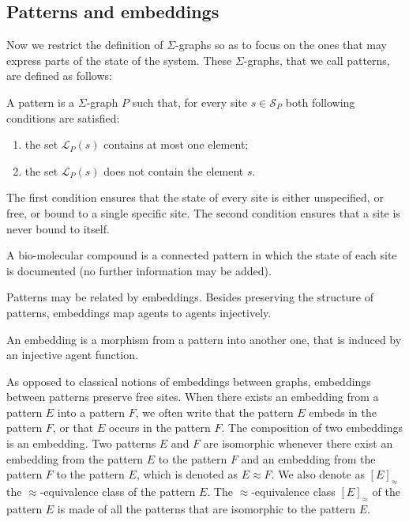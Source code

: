 \documentclass{entcs}
\newcommand{\graphsymb}{G}
\newcommand{\iso}{\approx}
\newcommand{\sites}[1][\graphsymb]{\mathcal{S}_{#1}}
\newcommand{\links}[1][\graphsymb]{\mathcal{L}_{#1}}
\begin{document}
\subsection{Patterns and embeddings}

Now we restrict the definition of $\Sigma$-graphs so as to
focus on the ones that may express parts of the state of the system.
These $\Sigma$-graphs, that we call patterns, are defined as follows:

\begin{defn}[patterns]
A pattern is a $\Sigma$-graph $P$ such that, for every site $s\in\sites[P]$ both following conditions are satisfied:
\begin{enumerate}
\item the set $\links[P](s)$ contains at most one element;
\item the set $\links[P](s)$ does not contain the element $s$.
\end{enumerate}
\end{defn}
The first condition ensures that the state of every site is either unspecified,
or free, or bound to a single specific site. The second condition ensures that a site is never bound to itself.

A bio-molecular compound is a connected pattern in which the state of each site is documented (no further information may be added).

Patterns may be related by embeddings. Besides preserving the structure of patterns, embeddings map agents to agents injectively.

\begin{defn}[embeddings]
  An embedding is a morphism from a pattern into another one, that is induced by an injective agent function.
\end{defn}

As opposed to classical notions of embeddings between graphs, embeddings between patterns preserve free sites.
When there exists an embedding from a pattern $E$ into a pattern $F$, we often write that the pattern $E$ embeds in the pattern $F$, or that $E$ occurs in the pattern $F$. The composition of two embeddings is an embedding. Two patterns $E$ and $F$ are isomorphic whenever there exist an embedding from the pattern $E$ to the pattern $F$ and an embedding from the pattern $F$ to the pattern $E$, which is denoted as $E \iso F$.  We also denote as $[E]_{\iso}$ the $\iso$-equivalence class of the pattern $E$. The $\iso$-equivalence class $[E]_{\iso}$ of the pattern $E$ is made of all the patterns that are isomorphic to the pattern $E$.
\end{document}

